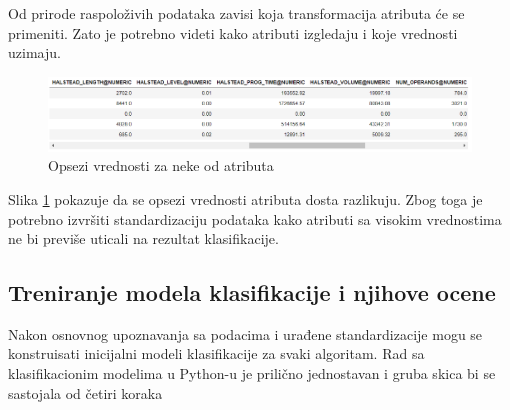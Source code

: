 \documentclass[12pt,oneside]{memoir}
\begin{document}
Od prirode raspoloživih podataka zavisi koja transformacija atributa će se primeniti. Zato je potrebno videti kako atributi izgledaju i koje vrednosti uzimaju.

\begin{figure}[!ht]
  \centering
  \includegraphics[width=1\textwidth]{atr_opsezi.png}
  \caption{Opsezi vrednosti za neke od atributa}
  \label{fig:atr_opsezi}
\end{figure}

Slika \ref{fig:atr_opsezi} pokazuje da se opsezi vrednosti atributa dosta razlikuju. Zbog toga je potrebno izvršiti standardizaciju podataka kako atributi sa visokim vrednostima ne bi previše uticali na rezultat klasifikacije. 

\subsection{Treniranje modela klasifikacije i njihove ocene}

Nakon osnovnog upoznavanja sa podacima i urađene standardizacije mogu se konstruisati inicijalni modeli klasifikacije za svaki algoritam. Rad sa klasifikacionim modelima u Python-u je prilično jednostavan i gruba skica bi se sastojala od četiri koraka \cite{scikit-learn}
\end{document}
